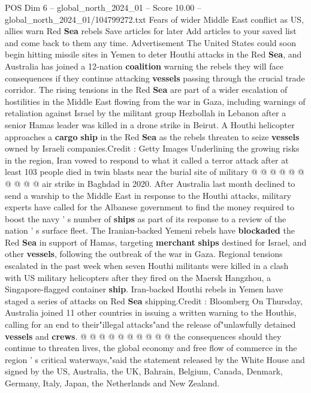 \begin{textsample}{POS Dim 6 – global\_north\_2024\_01 – Score 10.00 – global\_north\_2024\_01/104799272.txt}  \label{ex:f6_pos_093}
Fears of wider Middle East conflict as US, allies warn Red \textbf{Sea} rebels Save articles for later Add articles to your saved list and come back to them any time.
Advertisement The United States could soon begin hitting missile sites in Yemen to deter Houthi attacks in the Red \textbf{Sea}, and Australia has joined a 12-nation \textbf{coalition} warning the rebels they will face consequences if they continue attacking \textbf{vessels} passing through the crucial trade corridor.
The rising tensions in the Red \textbf{Sea} are part of a wider escalation of hostilities in the Middle East flowing from the war in Gaza, including warnings of retaliation against Israel by the militant group Hezbollah in Lebanon after a senior Hamas leader was killed in a drone strike in Beirut.
A Houthi helicopter approaches a \textbf{cargo} \textbf{ship} in the Red \textbf{Sea} as the rebels threaten to seize \textbf{vessels} owned by Israeli companies.Credit : Getty Images Underlining the growing risks in the region, Iran vowed to respond to what it called a terror attack after at least 103 people died in twin blasts near the burial site of military @ @ @ @ @ @ @ @ @ @ air strike in Baghdad in 2020.
After Australia last month declined to send a warship to the Middle East in response to the Houthi attacks, military experts have called for the Albanese government to find the money required to boost the navy ' s number of \textbf{ships} as part of its response to a review of the nation ' s surface fleet.
The Iranian-backed Yemeni rebels have \textbf{blockaded} the Red \textbf{Sea} in support of Hamas, targeting \textbf{merchant} \textbf{ships} destined for Israel, and other \textbf{vessels}, following the outbreak of the war in Gaza.
Regional tensions escalated in the past week when seven Houthi militants were killed in a clash with US military helicopters after they fired on the Maersk Hangzhou, a Singapore-flagged container \textbf{ship}.
Iran-backed Houthi rebels in Yemen have staged a series of attacks on Red \textbf{Sea} shipping.Credit : Bloomberg On Thursday, Australia joined 11 other countries in issuing a written warning to the Houthis, calling for an end to their"illegal attacks"and the release of"unlawfully detained \textbf{vessels} and \textbf{crews}. @ @ @ @ @ @ @ @ @ @ the consequences should they continue to threaten lives, the global economy and free flow of commerce in the region ' s critical waterways,"said the statement released by the White House and signed by the US, Australia, the UK, Bahrain, Belgium, Canada, Denmark, Germany, Italy, Japan, the Netherlands and New Zealand.

\end{textsample}
